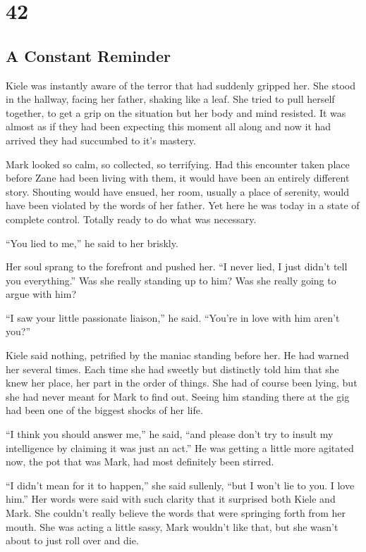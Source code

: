 \chapter{42}
\section{A Constant Reminder}


Kiele was instantly aware of the terror that had suddenly gripped her.  She stood in the hallway, facing her father, shaking like a leaf.  She tried to pull herself together, to get a grip on the situation but her body and mind resisted.  It was almost as if they had been expecting this moment all along and now it had arrived they had succumbed to it's mastery.  

Mark looked so calm, so collected, so terrifying.  Had this encounter taken place before Zane had been living with them, it would have been an entirely different story.  Shouting would have ensued, her room, usually a place of serenity, would have been violated by the words of her father.  Yet here he was today in a state of complete control.  Totally ready to do what was necessary.

``You lied to me,'' he said to her briskly.

Her soul sprang to the forefront and pushed her.  ``I never lied, I just didn't tell you everything.''  Was she really standing up to him?  Was she really going to argue with him?

``I saw your little passionate liaison,'' he said.  ``You're in love with him aren't you?''

Kiele said nothing, petrified by the maniac standing before her.  He had warned her several times.  Each time she had sweetly but distinctly told him that she knew her place, her part in the order of things.  She had of course been lying, but she had never meant for Mark to find out.  Seeing him standing there at the gig had been one of the biggest shocks of her life.

``I think you should answer me,'' he said, ``and please don't try to insult my intelligence by claiming it was just an act.''  He was getting a little more agitated now, the pot that was Mark, had most definitely been stirred.

``I didn't mean for it to happen,'' she said sullenly, ``but I won't lie to you.  I love him.''  Her words were said with such clarity that it surprised both Kiele and Mark.  She couldn't really believe the words that were springing forth from her mouth.  She was acting a little sassy, Mark wouldn't like that, but she wasn't about to just roll over and die. 

